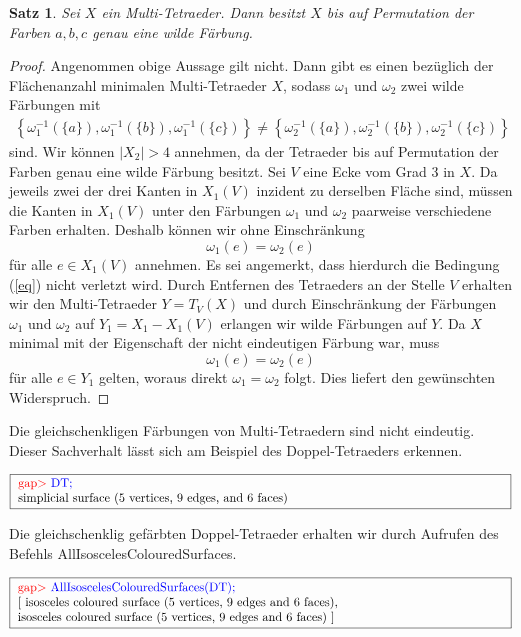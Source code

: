 \documentclass[12pt,titlepage,twoside,cleardoublepage]{article}
\theoremstyle{nummermitklammern}
\newtheorem{satz}[temp]{Satz}
\newtheorem{satz}[zahl]{Satz}
\numberwithin{equation}{section}
\begin{document}
\begin{satz}
Sei $X$ ein Multi-Tetraeder. Dann besitzt $X$ bis auf Permutation der Farben $a,b,c$ genau eine wilde Färbung.
\end{satz}
\begin{proof}
Angenommen obige Aussage gilt nicht. Dann gibt es einen bezüglich der Flächenanzahl minimalen Multi-Tetraeder $X$, sodass $\omega_1$ und $\omega_2$ zwei wilde Färbungen mit 
\begin{align} \label{eq}
\left\{\omega_1^{-1}(\{a\}),\omega_1^{-1}(\{b\}),\omega_1^{-1}(\{c\})\right\}\neq \left\{\omega_2^{-1}(\{a\}),\omega_2^{-1}(\{b\}),\omega_2^{-1}(\{c\})\right\}
\end{align}
sind. Wir können $\vert X_2\vert >4$ annehmen, da der Tetraeder bis auf Permutation der Farben genau eine wilde Färbung besitzt. Sei $V$ eine Ecke vom Grad 3 in $X.$ Da jeweils zwei der drei Kanten in $X_1(V)$ inzident zu derselben Fläche sind, müssen die Kanten in $X_1(V)$ unter den Färbungen $\omega_1$ und $\omega_2$ paarweise verschiedene Farben erhalten. Deshalb können wir ohne Einschränkung 
\[
\omega_1(e)=\omega_2(e)
\] 
für alle $e\in X_1(V)$ annehmen. Es sei angemerkt, dass hierdurch die Bedingung (\ref{eq}) nicht verletzt wird. Durch Entfernen des Tetraeders an der Stelle $V$ erhalten wir den Multi-Tetraeder $Y=T_V(X)$ und durch Einschränkung der Färbungen $\omega_1$ und $\omega_2$ auf $Y_1=X_1-X_1(V)$ erlangen wir wilde Färbungen auf $Y$. Da $X$ minimal mit der Eigenschaft der nicht eindeutigen Färbung war, muss
\[
\omega_1(e)=\omega_2(e)
\]
für alle $e\in Y_1$ gelten, woraus direkt $\omega_1=\omega_2$ folgt. Dies liefert den gewünschten Widerspruch.
\end{proof}
Die gleichschenkligen Färbungen von Multi-Tetraedern sind nicht eindeutig. Dieser Sachverhalt lässt sich am Beispiel des Doppel-Tetraeders erkennen.
\begin{center}
$\fbox{
\parbox{14cm}{
\textcolor{red}{gap$>$} \textcolor{blue}{ DT;}\\
simplicial surface (5 vertices, 9 edges, and 6 faces)
}}$
\end{center}
Die gleichschenklig gefärbten Doppel-Tetraeder erhalten wir durch Aufrufen des Befehls 
\textsf{AllIsoscelesColouredSurfaces}.
\begin{center}
$\fbox{
\parbox{14cm}{
\textcolor{red}{gap$>$} \textcolor{blue}{AllIsoscelesColouredSurfaces(DT);}\newline
[ isosceles coloured surface (5 vertices, 9 edges and 6 faces),\newline
  isosceles coloured surface (5 vertices, 9 edges and 6 faces) ]
}}$
\end{center}
\end{document}
